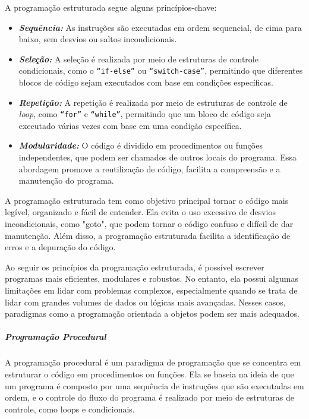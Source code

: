 \documentclass[a4paper, 12pt, onecolumn,singlespacing]{article}
\begin{document}
	A programação estruturada segue alguns princípios-chave:
	\begin{itemize}
		\item  \textbf{\textit{Sequência:}} As instruções são executadas em ordem sequencial, de cima para baixo, sem desvios ou saltos incondicionais.
		
		\item \textbf{\textit{Seleção:}} A seleção é realizada por meio de estruturas de controle condicionais, como o \texttt{``if-else''} ou \texttt{``switch-case''}, permitindo que diferentes blocos de código sejam executados com base em condições específicas.
		
		\item \textbf{\textit{Repetição:}} A repetição é realizada por meio de estruturas de controle de \textit{loop}, como \texttt{``for''} e \texttt{``while''}, permitindo que um bloco de código seja executado várias vezes com base em uma condição específica.
		
		\item \textbf{\textit{Modularidade:}} O código é dividido em procedimentos ou funções independentes, que podem ser chamados de outros locais do programa. Essa abordagem promove a reutilização de código, facilita a compreensão e a manutenção do programa.
		
	\end{itemize}
	
	A programação estruturada tem como objetivo principal tornar o código mais legível, organizado e fácil de entender. Ela evita o uso excessivo de desvios incondicionais, como "goto", que podem tornar o código confuso e difícil de dar manutenção. Além disso, a programação estruturada facilita a identificação de erros e a depuração do código.
	
	Ao seguir os princípios da programação estruturada, é possível escrever programas mais eficientes, modulares e robustos. No entanto, ela possui algumas limitações em lidar com problemas complexos, especialmente quando se trata de lidar com grandes volumes de dados ou lógicas mais avançadas. Nesses casos, paradigmas como a programação orientada a objetos podem ser mais adequados.
	
	\subparagraph{Programação Procedural}
    \label{programacao_procedural}
    
    A programação procedural é um paradigma de programação que se concentra em estruturar o código em procedimentos ou funções. Ela se baseia na ideia de que um programa é composto por uma sequência de instruções que são executadas em ordem, e o controle do fluxo do programa é realizado por meio de estruturas de controle, como loops e condicionais.
	
\end{document}
